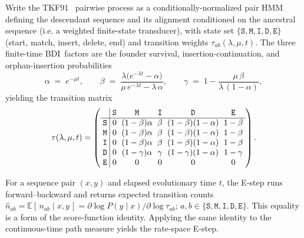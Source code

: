 \documentclass[11pt]{article}
\newcommand{\BDI}{\textsc{BDI}}
\newcommand{\E}{\mathbb{E}}
\newcommand{\ins}{\lambda}
\newcommand{\del}{\mu}
\newcommand{\ext}{r}
\newcommand{\hst}[1]{\texttt{#1}}
\begin{document}
Write the TKF91~\citep{ThorneEtAl91} pairwise process as a conditionally-normalized pair HMM defining the 
descendant sequence and its alignment conditioned on the ancestral sequence 
(i.e. a weighted finite-state transducer), with state set
$\{\hst{S},\hst{M},\hst{I},\hst{D},\hst{E}\}$ (start, match, insert,
delete, end) and transition weights $\tau_{ab}(\ins,\del,t)$. 
The three finite-time \BDI\ factors are the founder survival, insertion-continuation, and orphan-insertion probabilities~\citep{Kendall1948,Feller1939,KarlinMcGregor1957} 
\begin{equation}
\label{eq:abg}
\alpha \;=\; e^{-\del t}, \qquad
\beta \;=\; \frac{\ins\bigl(e^{-\ins t}-\alpha\bigr)}
                 {\del\,e^{-\ins t}-\ins\,\alpha}, \qquad
\gamma \;=\; 1-\frac{\del\,\beta}{\ins\,(1-\alpha)},
\end{equation}
yielding the transition 
matrix
\begin{equation}
\label{eq:cond_tkf91}
\tau(\ins,\del,t) =
\left(
    \setlength{\arraycolsep}{3pt}
    \begin{array}{r|ccccc}
    & \hst{S} & \hst{M} & \hst{I} & \hst{D} & \hst{E} \\
    \hline
    \hst{S} & 0 & (1-\beta)\alpha & \beta & (1-\beta)(1-\alpha) & 1-\beta \\
    \hst{M} & 0 & (1-\beta)\alpha & \beta & (1-\beta)(1-\alpha) & 1-\beta \\
    \hst{I} & 0 & (1-\beta)\alpha & \beta & (1-\beta)(1-\alpha) & 1-\beta \\
    \hst{D} & 0 & (1-\gamma)\alpha & \gamma & (1-\gamma)(1-\alpha) & 1-\gamma \\
    \hst{E} & 0 & 0 & 0 & 0 & 0
    \end{array}
\right).
\end{equation}


For a sequence pair $(x,y)$ and elapsed evolutionary time $t$, the E-step runs
forward--backward and returns expected transition counts
$\hat n_{ab}=\E[\,n_{ab}\mid x,y\,]=\partial \log P(y\mid x)/\partial \log \tau_{ab}$; $a,b \in \{ \hst{S}, \hst{M}, \hst{I}, \hst{D}, \hst{E} \}$.
This equality is a form of the score-function identity. Applying the
same identity to the continuous-time path measure yields the rate-space E-step.
\end{document}
